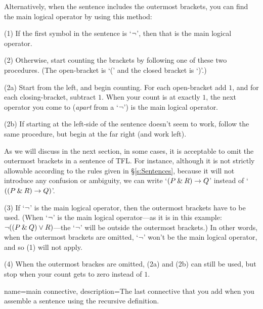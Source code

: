 Alternatively, when the sentence includes the outermost brackets, you can find the main logical operator by using this method:
\begin{ebullet}
	\item[(1)] If the first symbol in the sentence is `${\neg}$', then that is the main logical operator.
	\item[(2)] Otherwise, start counting the brackets by following one of these two procedures. (The open-bracket is `(' and the closed bracket is `)'.) 
	\begin{earg}
	\item[(2a)] Start from the left, and begin counting. For each open-bracket add $1$, and for each closing-bracket, subtract $1$. When your count is at exactly $1$, the next operator you come to (\emph{apart} from a `${\neg}$') is the main logical operator. 
	\item[(2b)] If starting at the left-side of the sentence doesn't seem to work, follow the same procedure, but begin at the far right (and work left). %
	\end{earg}
\end{ebullet}

As we will discuss in the next section, in some cases, it is acceptable to omit the outermost brackets in a sentence of TFL. For instance, although it is not strictly allowable according to the rules given in \S\ref{s:Sentences}, because it will not introduce any confusion or ambiguity, we can write `$(P \mathbin{\&} R) \rightarrow Q$' instead of `$((P \mathbin{\&} R) \rightarrow Q)$'. 

\begin{ebullet}
\item[(3)] If `${\neg}$' is the main logical operator, then the outermost brackets have to be used. (When `${\neg}$' is the main logical operator---as it is in this example: ${\neg}((P \mathbin{\&} Q) \vee R)$---the `${\neg}$' will be outside the outermost brackets.) In other words, when the outermost brackets are omitted, `${\neg}$' won't be the main logical operator, and so (1) will not apply. 
\item[(4)] When the outermost brackes are omitted, (2a) and (2b) can still be used, but stop when your count gets to zero instead of $1$.
\end{ebullet}

{
name=main connective,
description={The last connective that you add when you assemble a sentence using the recursive definition.}
}

